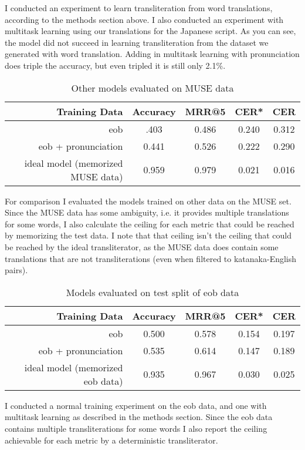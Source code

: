 \documentclass{article}
\begin{document}
I conducted an experiment to learn transliteration from word translations,
according to the methods section above.
I also conducted an experiment with multitask learning
using our translations for the Japanese script.
As you can see,
the model did not succeed in learning transliteration
from the dataset we generated with word translation.
Adding in multitask learning with pronunciation does triple the accuracy,
but even tripled it is still only 2.1\%.

\begin{table}[h]
  \centering
  \begin{tabular}{r | c c c c}
    Training Data & Accuracy & MRR@5 & CER* & CER \\
    \hline
    eob & .403 & 0.486 & 0.240 & 0.312 \\
    eob + pronunciation & 0.441 & 0.526 & 0.222 & 0.290 \\
    \hline
    ideal model (memorized MUSE data) & 0.959 & 0.979 & 0.021 & 0.016\\
  \end{tabular}
  \caption{Other models evaluated on MUSE data}
\end{table}

For comparison I evaluated the models trained on other data on the MUSE set.
Since the MUSE data has some ambiguity,
i.e. it provides multiple translations for some words,
I also calculate the ceiling for each metric
that could be reached by memorizing the test data.
I note that that ceiling isn't
the ceiling that could be reached by the ideal transliterator,
as the MUSE data does contain some translations that are not transliterations
(even when filtered to katanaka-English pairs).

\begin{table}[h]
  \centering
  \begin{tabular}{r | c c c c}
    Training Data & Accuracy & MRR@5 & CER* & CER \\
    \hline
    eob & 0.500 & 0.578 & 0.154 & 0.197 \\
    eob + pronunciation & 0.535 & 0.614 & 0.147 & 0.189 \\
    \hline
    ideal model (memorized eob data) & 0.935 & 0.967 & 0.030 & 0.025 \\
  \end{tabular}
  \caption{Models evaluated on test split of eob data}
\end{table}

I conducted a normal training experiment on the eob data,
and one with multitask learning as described in the methods section.
Since the eob data contains multiple transliterations for some words
I also report the ceiling achievable for each metric
by a deterministic transliterator.
\end{document}
